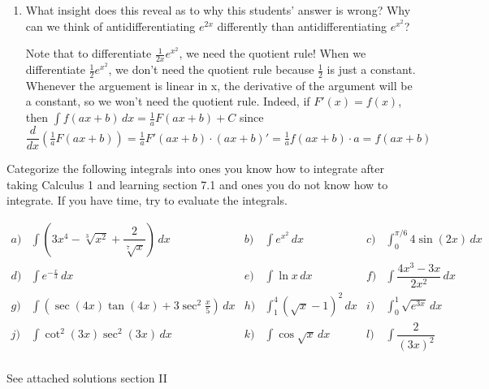 \documentclass[]{ximera}
\begin{document}
\begin{problem}
\begin{enumerate}
	\item 	What insight does this reveal as to why this students' answer is wrong?  Why can we think of antidifferentiating $e^{2x}$ differently than antidifferentiating $e^{x^2}$?
		
			\begin{freeResponse}
			Note that to differentiate $ \frac{1}{2x} e^{x^2} $, we need the quotient rule!  When we differentiate $ \frac{1}{2} e^{x^2}$, we don't need the quotient rule because $\frac{1}{2}$ is just a constant. \\
			Whenever the arguement is linear in x, the derivative of the argument will be a constant, so we won't need the quotient rule.  Indeed, if $F'(x) = f(x)$, then $\int f(ax+b) \, dx = \frac{1}{a}F(ax+b) + C$ since \\ 
			$\dfrac{d}{dx} \left( \frac{1}{a} F(ax+b) \right) = \frac{1}{a} F'(ax+b) \cdot (ax+b)' = \frac{1}{a}f(ax+b) \cdot a = f(ax+b)$
			\end{freeResponse}
	\end{enumerate}
		
		
\end{problem}

\begin{problem}
Categorize the following integrals into ones you know how to integrate after taking Calculus 1 and learning section 7.1 and ones you do not know how to integrate.  If you have time, try to evaluate the integrals.

\begin{align*}
a) & \int \left(3x^4-\sqrt[3]{x^2} + \dfrac{2}{\sqrt[7]{x}}\right)  \, dx  & b) & \int e^{x^2} \, dx & c) & \int^{\pi/6}_{0} 4 \sin(2x) \, dx  \\
d) & \int e^{-\frac{x}{3}} \, dx  & e) & \int \ln x \, dx & f) & \int \dfrac{4x^3-3x}{2x^2} \, dx  \\
g) & \int \left( \sec(4x) \tan(4x) + 3 \sec^2 \frac{x}{5} \right) \, dx  & h) & \int^4_1 (\sqrt{x}-1)^2 \, dx  & i) & \int_0^1 \sqrt{e^{3x}} \, dx  \\
j) &\int \cot^2 (3x) \sec^2 (3x) \, dx & k) & \int \cos \sqrt{x} \, dx & l) & \int \dfrac{2}{(3x)^2} \\
\end{align*}
			
	\begin{freeResponse}		
	See attached solutions section II
	\end{freeResponse}
		
\end{problem}
\end{document}
